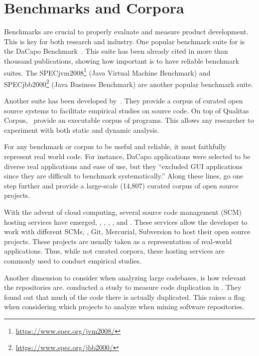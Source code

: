 \section{Benchmarks and Corpora}
\label{sec:lr:benchmarks}

Benchmarks are crucial to properly evaluate and measure product development.
This is key for both research and industry.
One popular benchmark suite for \java{} is the DaCapo Benchmark~\citep{blackburnDaCapoBenchmarksJava2006}.
This suite has been already cited in more than thousand publications, showing how important is to have reliable benchmark suites.
The SPECjvm2008\footnote{\url{https://www.spec.org/jvm2008/}}
(Java Virtual Machine Benchmark)
and
SPECjbb2000\footnote{\url{https://www.spec.org/jbb2000/}}
(Java Business Benchmark)
are another popular \java{} benchmark suite.

Another suite has been developed by~\cite{temperoQualitasCorpusCurated2010}.
They provide a corpus of curated open source systems to facilitate empirical studies on source code.
On top of Qualitas Corpus,~\cite{dietrichXCorpusExecutableCorpus2017} provide an executable corpus of \java{} programs.
This allows any researcher to experiment with both static and dynamic analysis.

For any benchmark or corpus to be useful and reliable,
it must faithfully represent real world code.
For instance,
DaCapo applications were selected to be diverse real applications and
ease of use, but they ``excluded GUI applications since they are difficult
to benchmark systematically.''
Along these lines, \cite{allamanisMiningSourceCode2013} go one step further and provide a large-scale (14,807) curated corpus of open source \java{} projects.

With the advent of cloud computing,
several source code management (SCM) hosting services have emerged, \eg,
\github, \gitlab, \bitbucket, and \sourceforge.
These services allow the developer to work with different SCMs, \eg,
Git, Mercurial, Subversion to host their open source projects.
These projects are usually taken as a representation of
real-world applications.
Thus, while not curated corpora, these hosting services are
commonly used to conduct empirical studies.

Another dimension to consider when analyzing large codebases, is how relevant the repositories are.
\cite{lopesDeJaVuMapCode2017} conducted a study to measure code duplication in \github{}.
They found out that much of the code there is actually duplicated.
This raises a flag when considering which projects to analyze when mining software repositories.

